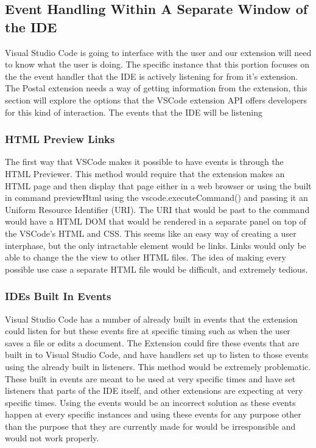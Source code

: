 \documentclass[letterpaper,10pt,titlepage,draftclsnofoot,onecolumn,onesided] {IEEEtran}
\begin{document}
%
\subsection{Event Handling Within A Separate Window of the IDE}
Visual Studio Code is going to interface with the user and our extension will need to know what the user is doing.
The specific instance that this portion focuses on the the event handler that the IDE is actively listening for from it's extension.
The Postal extension needs a way of getting information from the extension, this section will explore the options that the VSCode extension API offers developers for this kind of interaction. 
The events that the IDE will be listening 

\subsubsection{HTML Preview Links}
The first way that VSCode makes it possible to have events is through the HTML Previewer. \cite{VSCodeDocumentation} 
This method would require that the extension makes an HTML page and then display that page either in a web browser or using the built in command previewHtml using the vscode.executeCommand() and passing it an Uniform Resource Identifier (URI). 
The URI that would be past to the command would have a HTML DOM that would be rendered in a separate panel on top of the VSCode's HTML and CSS. 
This seems like an easy way of creating a user interphase, but the only intractable element would be links. 
Links would only be able to change the the view to other HTML files. 
The idea of making every possible use case a separate HTML file would be difficult, and extremely tedious.

\subsubsection{IDEs Built In Events}
Visual Studio Code has a number of already built in events that the extension could listen for but these events fire at specific timing such as when the user saves a file or edits a document. 
The Extension could fire these events that are built in to Visual Studio Code, and have handlers set up to listen to those events using the already built in listeners.
This method would be extremely problematic.
These built in events are meant to be used at very specific times and have set listeners that parts of the IDE itself, and other extensions are expecting at very specific times.
Using the events would be an incorrect solution as these events happen at every specific instances and using these events for any purpose other than the purpose that they are currently made for would be irresponsible and would not work properly.
\end{document}
